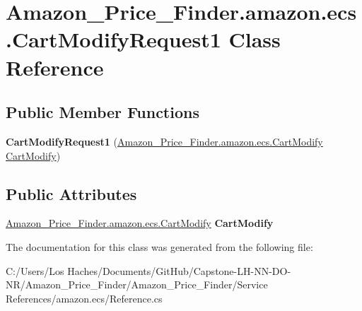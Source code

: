 \hypertarget{class_amazon___price___finder_1_1amazon_1_1ecs_1_1_cart_modify_request1}{\section{Amazon\-\_\-\-Price\-\_\-\-Finder.\-amazon.\-ecs.\-Cart\-Modify\-Request1 Class Reference}
\label{class_amazon___price___finder_1_1amazon_1_1ecs_1_1_cart_modify_request1}
}
\subsection*{Public Member Functions}
\begin{DoxyCompactItemize}
\item 
\hypertarget{class_amazon___price___finder_1_1amazon_1_1ecs_1_1_cart_modify_request1_a0ab47c4e918c4088fd86191112a48be3}{{\bfseries Cart\-Modify\-Request1} (\hyperlink{class_amazon___price___finder_1_1amazon_1_1ecs_1_1_cart_modify}{Amazon\-\_\-\-Price\-\_\-\-Finder.\-amazon.\-ecs.\-Cart\-Modify} \hyperlink{class_amazon___price___finder_1_1amazon_1_1ecs_1_1_cart_modify}{Cart\-Modify})}\label{class_amazon___price___finder_1_1amazon_1_1ecs_1_1_cart_modify_request1_a0ab47c4e918c4088fd86191112a48be3}

\end{DoxyCompactItemize}
\subsection*{Public Attributes}
\begin{DoxyCompactItemize}
\item 
\hypertarget{class_amazon___price___finder_1_1amazon_1_1ecs_1_1_cart_modify_request1_af10e82a5d49e638b8e934f47f30ba243}{\hyperlink{class_amazon___price___finder_1_1amazon_1_1ecs_1_1_cart_modify}{Amazon\-\_\-\-Price\-\_\-\-Finder.\-amazon.\-ecs.\-Cart\-Modify} {\bfseries Cart\-Modify}}\label{class_amazon___price___finder_1_1amazon_1_1ecs_1_1_cart_modify_request1_af10e82a5d49e638b8e934f47f30ba243}

\end{DoxyCompactItemize}


The documentation for this class was generated from the following file\-:\begin{DoxyCompactItemize}
\item 
C\-:/\-Users/\-Los Haches/\-Documents/\-Git\-Hub/\-Capstone-\/\-L\-H-\/\-N\-N-\/\-D\-O-\/\-N\-R/\-Amazon\-\_\-\-Price\-\_\-\-Finder/\-Amazon\-\_\-\-Price\-\_\-\-Finder/\-Service References/amazon.\-ecs/Reference.\-cs\end{DoxyCompactItemize}
